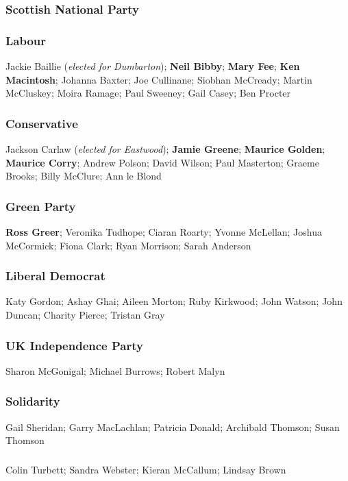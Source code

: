 \begin{resultsiii}
\subsubsection*{Scottish National Party}
\subsubsection*{Labour}
Jackie Baillie (\emph{elected for Dumbarton}); \textbf{Neil Bibby}; \textbf{Mary Fee}; \textbf{Ken Macintosh}; Johanna Baxter; Joe Cullinane; Siobhan McCready; Martin McCluskey; Moira Ramage; Paul Sweeney; Gail Casey; Ben Procter
\subsubsection*{Conservative}
Jackson Carlaw (\emph{elected for Eastwood}); \textbf{Jamie Greene}; \textbf{Maurice Golden}; \textbf{Maurice Corry}; Andrew Polson; David Wilson; Paul Masterton; Graeme Brooks; Billy McClure; Ann le Blond
\subsubsection*{Green Party}
\textbf{Ross Greer}; Veronika Tudhope; Ciaran Roarty; Yvonne McLellan; Joshua McCormick; Fiona Clark; Ryan Morrison; Sarah Anderson
\subsubsection*{Liberal Democrat}
Katy Gordon; Ashay Ghai; Aileen Morton; Ruby Kirkwood; John Watson; John Duncan; Charity Pierce; Tristan Gray
\subsubsection*{UK Independence Party}
Sharon McGonigal; Michael Burrows; Robert Malyn
\subsubsection*{Solidarity}
Gail Sheridan; Garry MacLachlan; Patricia Donald; Archibald Thomson; Susan Thomson
\subsubsection*{\RISE}
Colin Turbett; Sandra Webster; Kieran McCallum; Lindsay Brown
\end{resultsiii}

